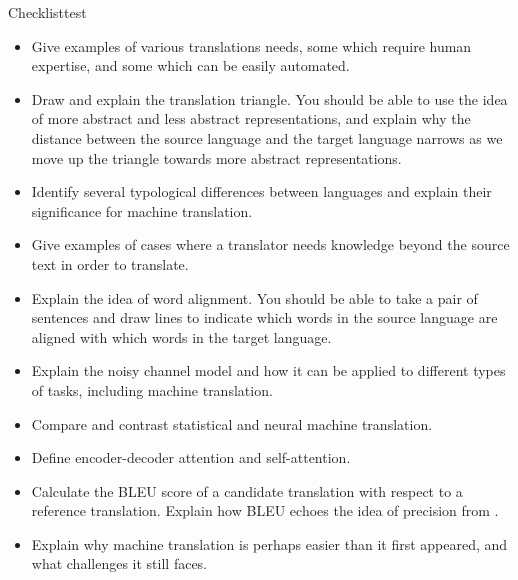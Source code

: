 \begin{tblsfilledsymbol}{Checklist}{test}

\begin{itemize}
\item Give examples of various translations needs, some which require human expertise, and some which  can be easily automated.
\item Draw and explain the translation triangle. You should be able to use the idea of more abstract and less abstract representations, and explain why the distance between the source language and the target language narrows as we move up the triangle towards more abstract representations.
\item Identify several typological differences between languages and explain their significance for machine translation.
\item Give examples of cases where a translator needs knowledge beyond the source text in order to translate.
\item Explain the idea of word alignment. You should be able to take a pair of sentences and draw lines to indicate which words in the source language are aligned with which words in the target language.  
\item Explain the noisy channel model and how it can be applied to different types of tasks, including machine translation.
\item Compare and contrast statistical and neural machine translation.
\item Define encoder-decoder attention and self-attention.
\item Calculate the BLEU score of a candidate translation with respect to a reference translation.  Explain how BLEU echoes the idea of precision from .
\item  Explain why machine translation is perhaps easier than it first appeared, and what challenges it still faces.
\end{itemize}
\end{tblsfilledsymbol}


